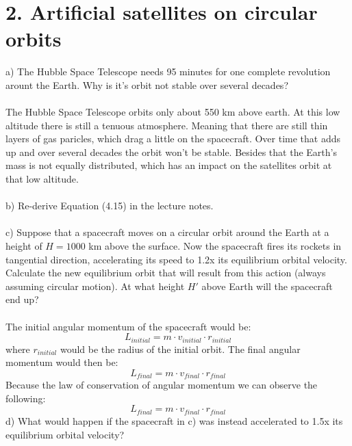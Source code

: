 \section*{2. Artificial satellites on circular orbits}

a) The Hubble Space Telescope needs 95 minutes for one complete revolution arount the Earth. Why is it's
orbit not stable over several decades?\\
\\
The Hubble Space Telescope orbits only about 550 km above earth. At this low altitude there is still a 
tenuous atmosphere. Meaning that there are still thin layers of gas paricles, which drag a little on
the spacecraft. Over time that adds up and over several decades the orbit won't be stable. Besides that
the Earth's mass is not equally distributed, which has an impact on the satellites orbit at that low
altitude.\\
\\
b) Re-derive Equation (4.15) in the lecture notes.\\
\\
c) Suppose that a spacecraft moves on a circular orbit around the Earth at a height of $H = 1000$ km
above the surface. Now the spacecraft fires its rockets in tangential direction, accelerating its speed
to 1.2x its equilibrium orbital velocity. Calculate the new equilibrium orbit that will result from this
action (always assuming circular motion). At what height $H'$ above Earth will the spacecraft end up?\\
\\
The initial angular momentum of the spacecraft would be:
\begin{equation*}
    L_{initial} = m \cdot v_{initial} \cdot r_{initial}
\end{equation*}
where $r_{initial}$ would be the radius of the initial orbit. The final angular momentum would then be:
\begin{equation*}
    L_{final} = m \cdot v_{final} \cdot r_{final}
\end{equation*}
Because the law of conservation of angular momentum we can observe the following:
\begin{equation*}
    L_{final} = m \cdot v_{final} \cdot r_{final}
\end{equation*}
d) What would happen if the spacecraft in c) was instead accelerated to 1.5x its equilibrium orbital
velocity?\\
\\
